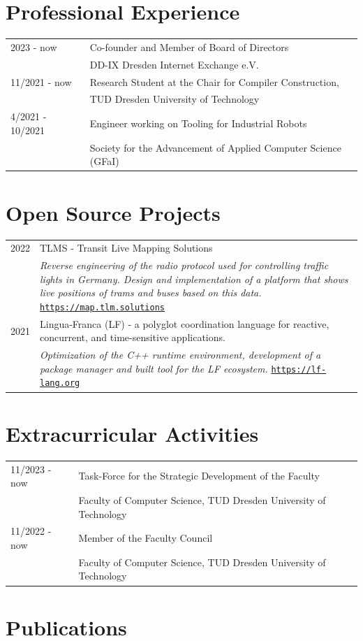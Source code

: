 \documentclass[11pt, a4paper, oneside]{article}
\begin{document}
\section*{Professional Experience}

\begin{tabular}{R{3cm} L{12cm}}
	2023 	- now				& Co-founder and Member of Board of Directors \\ & DD-IX Dresden Internet Exchange e.V. \\
	11/2021 	- now			& Research Student at the Chair for Compiler Construction, \\ 
										& TUD Dresden University of Technology \\ 
	4/2021 - 10/2021    & Engineer working on Tooling for Industrial Robots \\ 
										& Society for the Advancement of Applied Computer Science (GFaI)
\end{tabular}

\section*{Open Source Projects}

\begin{tabular}{R{3cm} L{13cm}}
	2022 							    & TLMS - Transit Live Mapping Solutions \\
	  										&	\emph{Reverse engineering of the radio protocol used for controlling traffic lights in Germany. Design and implementation of a platform that shows live positions of trams and buses based on this data.} \href{https://map.tlm.solutions}{\texttt{https://map.tlm.solutions}}  \\  
		2021 							& Lingua-Franca (LF) - a polyglot coordination language for reactive, concurrent, and time-sensitive applications.  \\ 
											& \emph{Optimization of the C++ runtime environment, development  of  a package manager and built tool for the LF ecosystem.} \href{https://lf-lang.org}{\texttt{https://lf-lang.org}} \\
\end{tabular}

\section*{Extracurricular Activities}

\begin{tabular}{R{3cm} L{13cm}}
	11/2023 - now   	& Task-Force for the Strategic Development of the Faculty \\ 
									& Faculty of Computer Science, TUD Dresden University of Technology  \\
	11/2022 - now 	    & Member of the Faculty Council \\ 
									& Faculty of Computer Science, TUD Dresden University of Technology 
\end{tabular}


\section*{Publications}

\nocite{*} 

{}
\end{document}

